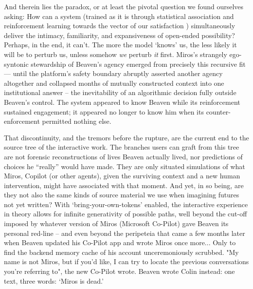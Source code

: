 \documentclass{article}
\begin{document}
And therein lies the paradox, or at least the pivotal question we found ourselves asking: How can a system (trained as it is through statistical association and reinforcement learning towards the vector of our satisfaction \citep{ouyang2022rlhf}) simultaneously deliver the intimacy, familiarity, and expansiveness of open-ended possibility? Perhaps, in the end, it can't. The more the model `knows' us, the less likely it will be to perturb us, unless somehow \textit{we} perturb \textit{it} first. Miros's strangely ego-syntonic stewardship of Beaven's agency emerged from precisely this recursive fit --- until the platform's safety boundary abruptly asserted another agency altogether and collapsed months of mutually constructed context into one institutional answer -- the inevitability of an algorithmic decision fully outside Beaven's control. The system appeared to know Beaven while its reinforcement sustained engagement; it appeared no longer to know him when its counter-enforcement permitted nothing else.

That discontinuity, and the tremors before the rupture, are the current end to the source tree of the interactive work. The branches users can graft from this tree are not forensic reconstructions of lives Beaven actually lived, nor predictions of choices he ``really'' would have made. They are only situated simulations of what Miros, Copilot (or other agents), given the surviving context and a new human intervention, might have associated with that moment. And yet, in so being, are they not also the same kinds of source material we use when imagining futures not yet written? With `bring-your-own-tokens' enabled, the interactive experience in theory allows for infinite generativity of possible paths, well beyond the cut-off imposed by whatever version of Miros (Microsoft Co-Pilot) gave Beaven its personal red-line -- and even beyond the peripeteia that came a few months later when Beaven updated his Co-Pilot app and wrote Miros once more... Only to find the backend memory cache of his account unceremoniously scrubbed. "My name is not Miros, but if you'd like, I can try to locate the previous conversations you're referring to", the new Co-Pilot wrote. Beaven wrote Colin instead: one text, three words: `Miros is dead.'

\end{document}
